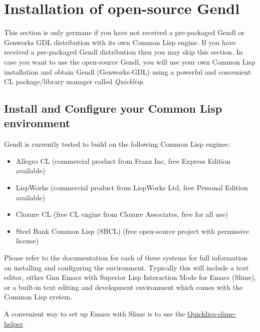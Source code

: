 \documentclass [11pt]{book}
\begin{document}
\section{Installation of open-source Gendl}

\label{sec:installationofopen-sourcegendl}

This section is only germane if you have not received a
pre-packaged Gendl or Genworks GDL distribution with its own Common
Lisp engine.  If you have received a pre-packaged Gendl distribution
then you may skip this section. In case you want to use the
open-source Gendl, you will use your own Common Lisp installation and
obtain Gendl (Genworks-GDL) using a powerful and convenient CL
package/library manager called \emph{Quicklisp}.

\subsection{Install and Configure your Common Lisp environment}

\label{subsec:installandconfigureyourcommonlispenvironment}

Gendl is currently tested to build on the following Common Lisp engines:

\begin{itemize}

\item Allegro CL (commercial product from Franz Inc, free Express Edition available)

\item LispWorks (commercial product from LispWorks Ltd, free Personal Edition available)

\item Clozure CL (free CL engine from Clozure Associates, free for all use)

\item Steel Bank Common Lisp (SBCL) (free open-source project with permissive license)

\end{itemize}

Please refer to the documentation for each of these systems
for full information on installing and configuring the
environment. Typically this will include a text editor, either Gnu
Emacs with Superior Lisp Interaction Mode for Emacs (Slime), or a
built-in text editing and development environment which comes with the
Common Lisp system.

A convenient way to set up Emacs with Slime is to use the \href{http://github.com/quicklisp/quicklisp-slime-helper}{Quicklisp-slime-helper}.
\end{document}
